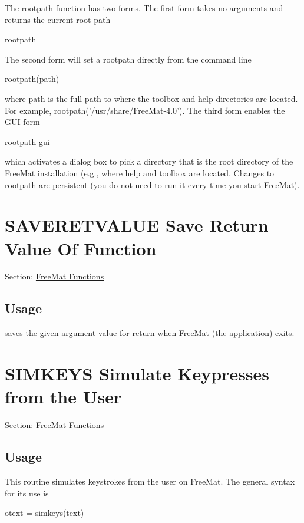 The {\ttfamily rootpath} function has two forms. The first form takes no arguments and returns the current root path \begin{DoxyVerb}   rootpath
\end{DoxyVerb}
 The second form will set a rootpath directly from the command line \begin{DoxyVerb}   rootpath(path)
\end{DoxyVerb}
 where {\ttfamily path} is the full path to where the {\ttfamily toolbox} and {\ttfamily help} directories are located. For example, {\ttfamily rootpath('/usr/share/\-Free\-Mat-\/4.0')}. The third form enables the G\-U\-I form \begin{DoxyVerb}   rootpath gui
\end{DoxyVerb}
 which activates a dialog box to pick a directory that is the root directory of the Free\-Mat installation (e.\-g., where {\ttfamily help} and {\ttfamily toolbox} are located. Changes to {\ttfamily rootpath} are persistent (you do not need to run it every time you start Free\-Mat). \hypertarget{freemat_saveretvalue}{}\section{S\-A\-V\-E\-R\-E\-T\-V\-A\-L\-U\-E Save Return Value Of Function}\label{freemat_saveretvalue}
Section\-: \hyperlink{sec_freemat}{Free\-Mat Functions} \hypertarget{vtkwidgets_vtkxyplotwidget_Usage}{}\subsection{Usage}\label{vtkwidgets_vtkxyplotwidget_Usage}
saves the given argument value for return when Free\-Mat (the application) exits. \hypertarget{freemat_simkeys}{}\section{S\-I\-M\-K\-E\-Y\-S Simulate Keypresses from the User}\label{freemat_simkeys}
Section\-: \hyperlink{sec_freemat}{Free\-Mat Functions} \hypertarget{vtkwidgets_vtkxyplotwidget_Usage}{}\subsection{Usage}\label{vtkwidgets_vtkxyplotwidget_Usage}
This routine simulates keystrokes from the user on Free\-Mat. The general syntax for its use is \begin{DoxyVerb}   otext = simkeys(text)
\end{DoxyVerb}

